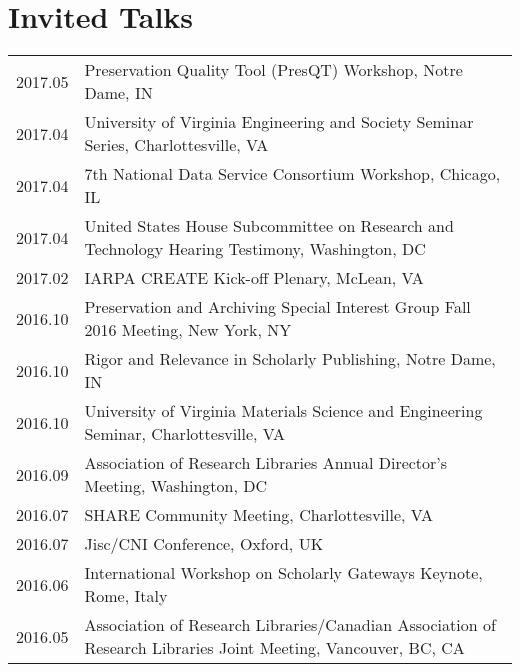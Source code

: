 \documentclass[11pt]{article}
\begin{document}
\section*{Invited Talks}
\begin{tabularx}{\textwidth}{lX}
    2017.05     & Preservation Quality Tool (PresQT) Workshop, Notre Dame, IN\\%
    2017.04     & University of Virginia Engineering and Society Seminar Series, Charlottesville, VA\\
    2017.04     & 7th National Data Service Consortium Workshop, Chicago, IL\\ %
    2017.04     & United States House Subcommittee on Research and Technology Hearing Testimony, Washington, DC\\ %
    2017.02     & IARPA CREATE Kick-off Plenary, McLean, VA\\
    2016.10     & Preservation and Archiving Special Interest Group Fall 2016 Meeting, New York, NY\\ %
    2016.10     & Rigor and Relevance in Scholarly Publishing, Notre Dame, IN\\ %
    2016.10     & University of Virginia Materials Science and Engineering Seminar, Charlottesville, VA\\ %
    2016.09     & Association of Research Libraries Annual Director's Meeting, Washington, DC\\ %
    2016.07     & SHARE Community Meeting, Charlottesville, VA\\
    2016.07     & Jisc/CNI Conference, Oxford, UK\\
    2016.06     & International Workshop on Scholarly Gateways Keynote, Rome, Italy\\
    2016.05     & Association of Research Libraries/Canadian Association of Research Libraries Joint Meeting, Vancouver, BC, CA\\

\end{tabularx}
\end{document}
